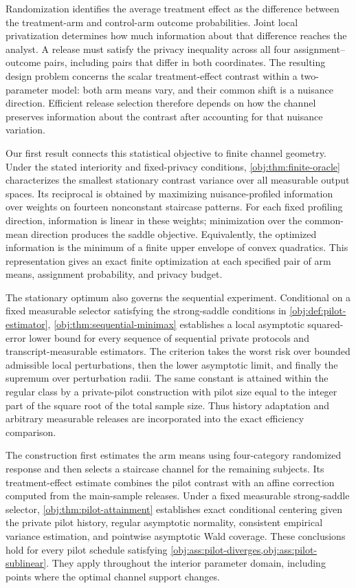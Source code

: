 \documentclass[11pt]{article}
\begin{document}
Randomization identifies the average treatment effect as the difference between the treatment-arm and control-arm outcome probabilities. Joint local privatization determines how much information about that difference reaches the analyst. A release must satisfy the privacy inequality across all four assignment--outcome pairs, including pairs that differ in both coordinates. The resulting design problem concerns the scalar treatment-effect contrast within a two-parameter model: both arm means vary, and their common shift is a nuisance direction. Efficient release selection therefore depends on how the channel preserves information about the contrast after accounting for that nuisance variation.

Our first result connects this statistical objective to finite channel geometry. Under the stated interiority and fixed-privacy conditions, \cref{obj:thm:finite-oracle} characterizes the smallest stationary contrast variance over all measurable output spaces. Its reciprocal is obtained by maximizing nuisance-profiled information over weights on fourteen nonconstant staircase patterns. For each fixed profiling direction, information is linear in these weights; minimization over the common-mean direction produces the saddle objective. Equivalently, the optimized information is the minimum of a finite upper envelope of convex quadratics. This representation gives an exact finite optimization at each specified pair of arm means, assignment probability, and privacy budget.

The stationary optimum also governs the sequential experiment. Conditional on a fixed measurable selector satisfying the strong-saddle conditions in \cref{obj:def:pilot-estimator}, \cref{obj:thm:sequential-minimax} establishes a local asymptotic squared-error lower bound for every sequence of sequential private protocols and transcript-measurable estimators. The criterion takes the worst risk over bounded admissible local perturbations, then the lower asymptotic limit, and finally the supremum over perturbation radii. The same constant is attained within the regular class by a private-pilot construction with pilot size equal to the integer part of the square root of the total sample size. Thus history adaptation and arbitrary measurable releases are incorporated into the exact efficiency comparison.

The construction first estimates the arm means using four-category randomized response and then selects a staircase channel for the remaining subjects. Its treatment-effect estimate combines the pilot contrast with an affine correction computed from the main-sample releases. Under a fixed measurable strong-saddle selector, \cref{obj:thm:pilot-attainment} establishes exact conditional centering given the private pilot history, regular asymptotic normality, consistent empirical variance estimation, and pointwise asymptotic Wald coverage. These conclusions hold for every pilot schedule satisfying \cref{obj:ass:pilot-diverges,obj:ass:pilot-sublinear}. They apply throughout the interior parameter domain, including points where the optimal channel support changes.
\end{document}
